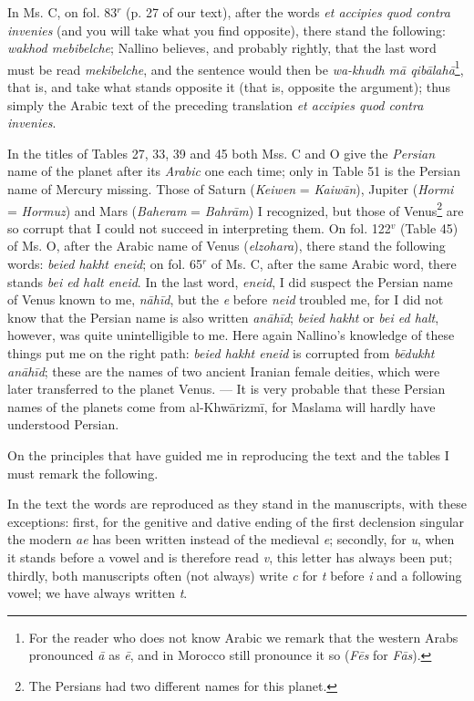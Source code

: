 \documentclass[11pt]{article}
\newcommand{\Pg}[1]{\marginpar{\footnotesize\color{gray}#1}}
\begin{document}
\par In Ms. C, on fol. 83$^{r}$ (p. 27 of our text), after the words \emph{et accipies quod contra invenies} (and you will take what you find opposite), there stand the following: \emph{wakhod mebibelche}; Nallino believes, and probably rightly, that the last word must be read \emph{mekibelche}, and the sentence would then be \emph{wa-khudh mā qibālahā}\footnote{For the reader who does not know Arabic we remark that the western Arabs pronounced \emph{ā} as \emph{ē}, and in Morocco still pronounce it so (\emph{Fēs} for \emph{Fās}).}, that is, and take what stands opposite it (that is, opposite the argument); thus simply the Arabic text of the preceding translation \emph{et accipies quod contra invenies}.\par
\par In the titles of Tables 27, 33, 39 and 45 both Mss. C and O give the \emph{Persian} name of the planet after its \emph{Arabic} one each time; only in Table 51 is the Persian name of Mercury missing. Those of Saturn (\emph{Keiwen} = \emph{Kaiwān}), Jupiter (\emph{Hormi} = \emph{Hormuz}) and Mars (\emph{Baheram} = \emph{Bahrām}) I recognized, but those of Venus\footnote{The Persians had two different names for this planet.} are so corrupt that I could not succeed in interpreting them. On fol. 122$^{v}$ (Table 45) of Ms. O, after the Arabic name of Venus (\emph{elzohara}), there stand the following words: \emph{beied hakht eneid}; on fol. 65$^{r}$ of Ms. C, after the same Arabic word, there stands \emph{bei ed halt eneid}. In the last word, \emph{eneid}, I did suspect the Persian name of Venus known to me, \emph{nāhīd}, but the \emph{e} before \emph{neid} troubled me, for I did not know that the Persian name is also written \emph{anāhīd}; \emph{beied hakht} or \emph{bei ed halt}, however, was quite unintelligible to me. Here again Nallino's knowledge of these things put me on the right path: \emph{beied hakht eneid} is corrupted from \emph{bēdukht anāhīd}; these are the names of two ancient Iranian female deities, which were later transferred to the planet Venus. — It is very probable that these Persian names of the planets come from al-Khwārizmī, for Maslama will hardly have understood Persian.\par
\par \Pg{XXIII}On the principles that have guided me in reproducing the text and the tables I must remark the following.\par
\par In the text the words are reproduced as they stand in the manuscripts, with these exceptions: first, for the genitive and dative ending of the first declension singular the modern \emph{ae} has been written instead of the medieval \emph{e}; secondly, for \emph{u}, when it stands before a vowel and is therefore read \emph{v}, this letter has always been put; thirdly, both manuscripts often (not always) write \emph{c} for \emph{t} before \emph{i} and a following vowel; we have always written \emph{t}.\par
\end{document}
